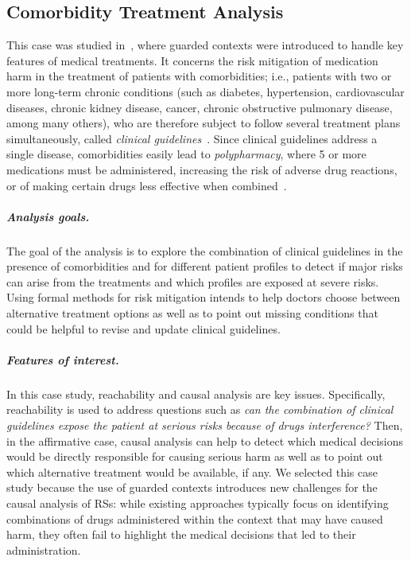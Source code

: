 
\subsection{Comorbidity Treatment Analysis}\label{sec:cmsb2024}

This case was studied in~\cite{DBLP:conf/cmsb/BowlesBBFGM24}, where guarded contexts were introduced to handle key features of medical treatments. It concerns the risk mitigation of medication harm in the treatment of patients with comorbidities; i.e., patients with two or more long-term chronic conditions (such as diabetes, hypertension, cardiovascular diseases, chronic kidney disease, cancer, chronic obstructive pulmonary disease, among many others), who are therefore subject to follow several treatment plans simultaneously, called \emph{clinical guidelines}~\cite{feder1999using,woolf1999potential}. Since clinical guidelines address a single disease, comorbidities easily lead to  \emph{polypharmacy}, where 5 or more medications must be administered, increasing the risk of adverse drug reactions, or of making certain drugs less effective when combined~\cite{Gut12}. 

\subparagraph*{Analysis goals.}
The goal of the analysis is to explore the combination of clinical guidelines in the presence of comorbidities and for different patient profiles to detect if major risks can arise from the treatments and which profiles are exposed at severe risks.
Using formal methods for risk mitigation intends to help doctors choose between alternative treatment options as well as to point out missing conditions that could be helpful to revise and update clinical guidelines. 

\subparagraph*{Features of interest.}
In this case study, reachability and causal analysis are key issues.
Specifically, reachability is used to address questions such as \emph{can the combination of clinical guidelines expose the patient at serious risks because of drugs interference?}
Then, in the affirmative case, causal analysis can help to detect which medical decisions would be directly responsible for causing serious harm as well as to point out  which alternative treatment would be available, if any.
We selected this case study because the use of guarded contexts introduces new challenges for the causal analysis of RSs: while existing approaches typically focus on identifying combinations of drugs administered within the context that may have caused harm, they often fail to highlight the medical decisions that led to their administration.

